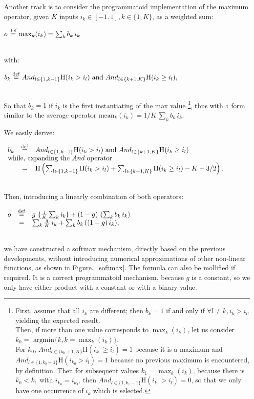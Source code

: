 \documentclass[a4]{article} \usepackage[left=2cm,right=3cm,top=1cm,bottom=2cm]{geometry}
\newcommand{\eqline}[1]{~\vspace{0.1cm}\\\centerline{$#1$}\vspace{0.1cm}\\}
\newcommand{\defq}{\stackrel {\rm def}{=}}
\begin{document}
Another track is to consider the programmatoid implementation of the maximum operator, given $K$ inputs $i_k \in [-1, 1], k \in \{1, K\}$, as a weighted sum:
\eqline{o \defq \max_k(i_k) = \sum_k b_k \, i_k}
with:
\eqline{b_k \defq And_{l \in \{1, k-1\}} \mbox{H}(i_k >  i_l) \mbox{ and } And_{l \in \{k+1, K\}} \mbox{H}(i_k \ge i_l),}
So that $b_k = 1$ if $i_k$ is the first instantiating of the max value \footnote{
First, assume that all $i_k$ are different; then $b_k = 1$ if and only if $\forall l \ne k, i_k > i_l$, yielding the expected result.\\
Then, if more than one value corresponds to $\max_k(i_k)$, let us consider $k_0 = \mbox{ argmin} \{k, k = \max_k(i_k)\}$. \\
For $k_0$, $And_{l \in \{k_0+1, K\}} \mbox{H}(i_{k_0} \ge i_l) = 1$ because it is a maximum and $And_{l \in \{1, k_0-1\}} \mbox{H}(i_{k_0} >  i_l) =1$ because no previous maximum is encountered, by definition. Then for subsequent values $k_1 = \max_k(i_k)$, because there is $k_0 < k_1$ with $i_{k_0} = i_{k_1}$, then $And_{l \in \{1, k_1-1\}} \mbox{H}(i_{k_1} >  i_l) = 0$, so that we only have one occurrence of $i_k$ which is selected.}, thus with a form similar to the average operator $\mbox{mean}_k(i_k) = 1/K \, \sum_k b_k \, i_k$.

We easily derive:
\eqline{\begin{array}{rcl}
    b_k &\defq& And_{l \in \{1, k-1\}} \mbox{H}(i_k >  i_l) \mbox{ and } And_{l \in \{k+1, K\}} \mbox{H}(i_k \ge i_l) \\
    \multicolumn{3}{l}{\mbox{while, expanding the $And$ operator}}\\
    &=&  \mbox{H}\left(\sum_{l \in \{1, k-1\}}  \mbox{H}(i_k >  i_l) + \sum_{l \in \{k+1, K\}} \mbox{H}(i_k \ge i_l) - K + 3/2\right). \\
\end{array}}

Then, introducing a linearly combination of both operators:
\eqline{\begin{array}{rcl}
    o &\defq& g \, \left(\frac{1}{K} \sum_k i_k \right) + (1-g) \, \left(\sum_k b_k \, i_k \right) \\
   &=& \sum_k \frac{q}{K} \, i_k + \sum_k b_k \, ((1-g)  \, i_k), \\
\end{array}}
we have constructed  a softmax mechanism, directly based on the previous developments, without introducing numerical approximations of other non-linear functions, as shown in Figure.~\ref{softmax}. The formula can also be mollified if required.
It is a correct programmatoid mechanism, because $g$ is a constant, so we only have either product with a constant or with a binary value.
\end{document}
